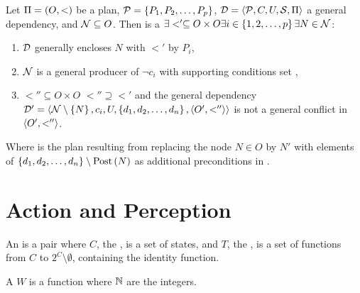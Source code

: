 \begin{defi}
Let $\Pi=\left( O,<\right)$ be a plan, $\mathcal{P}=\left\{ P_1,P_2,\ldots,P_p\right\}$, $\mathcal{D}=\left\langle \mathcal{P},C,U,\mathcal{S},\Pi\right\rangle$ a general dependency, and $\mathcal{N}\subseteq O$. Then \tuple{\calD,\calN} is a  \iffTx{} $\exists <'\subseteq O\times O\exists i\in\left\{ 1,2,\ldots,p\right\}\exists N\in\mathcal{N}$:
\begin{enumerate}
 \item $\mathcal{D}$ generally encloses $N$ with $<'$ by $P_i$,
 \item $\mathcal{N}$ is a general producer of $\neg c_i$ with supporting conditions set ,
 \item \tiTx{} $<''\subseteq O\times O$ \stTx{} $<''\supseteq<'$ and the general dependency $\mathcal{D}'=\left\langle \mathcal{N}\setminus\left\{ N\right\},c_i,U,\left\{ d_1,d_2,\ldots,d_n\right\},\left\langle O',<''\right\rangle\right\rangle$ is not a general conflict in $\left\langle O',<''\right\rangle$.
\end{enumerate}
Where  is the plan resulting from replacing the node $N\in O$ by $N'$ with elements of $\left\{ d_1,d_2,\ldots,d_n\right\}\setminus\mbox{Post}\left(N\right)$ as additional preconditions in .
\cite{conf/ijcai/HertzbergH89}
\end{defi}

\section{Action and Perception}

\begin{defi}
An  is a pair  where $C$, the , is a set of states, and $T$, the , is a set of functions from $C$ to $2^C\setminus\emptyset$, containing the identity function.
\cite{conf/ijcai/BrafmanS95}
\end{defi}

\begin{defi}
A  $W$ is a function  where $\mathbb{N}$ are the integers.
\cite{conf/ijcai/BrafmanS95}
\end{defi}

